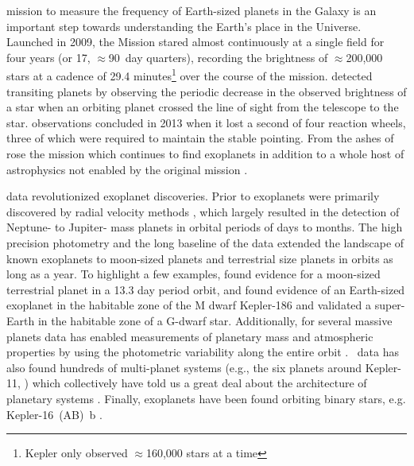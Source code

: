 
 mission to measure the frequency of Earth-sized planets in the Galaxy is an important step towards understanding the Earth's place in the Universe.  Launched in 2009, the \Kepler{} Mission \citep{Koch2010,Borucki2016} stared almost continuously at a single field for four years (or 17, $\approx$90~day quarters), recording the brightness of $\approx$200,000 stars at a cadence of 29.4 minutes\footnote{Kepler only observed $\approx$160,000 stars at a time} over the course of the mission. \Kepler{} detected transiting planets by observing the periodic decrease in the observed brightness of a star when an orbiting planet crossed the line of sight from the telescope to the star.  observations concluded in 2013 when it lost a second of four reaction wheels, three of which were required to maintain the stable pointing.  From the ashes of \Kepler{} rose the \Ktwo{} mission which continues to find exoplanets in addition to a whole host of astrophysics not enabled by the original \Kepler{} mission \citep{Howell2014,VanCleve2016K2}.


\Kepler{} data revolutionized exoplanet discoveries. Prior to \Kepler{,} exoplanets were primarily discovered by radial velocity methods \citep[e.g.][]{Mayor1995}, which largely resulted in the detection of Neptune- to Jupiter- mass planets in orbital periods of days to months. The high precision photometry and the long baseline of the \Kepler{} data extended the landscape of known exoplanets to moon-sized planets and terrestrial size planets in orbits as long as a year. To highlight a few examples, \citet{Barclay2013} found evidence for a moon-sized terrestrial planet in a 13.3 day period orbit, and \citet{Quintana2014} found evidence of an Earth-sized exoplanet in the habitable zone of the M dwarf Kepler-186 and \citet{Jenkins2015} validated a super-Earth in the habitable zone of a G-dwarf star. Additionally, for several massive planets \Kepler{} data has enabled measurements of planetary mass and atmospheric properties by using the photometric variability along the entire orbit \citep{Shporer2011,Mazeh2012,Shporer2017}. \Kepler\ data has also found hundreds of multi-planet systems (e.g., the six planets around Kepler-11, \citet{Lissauer2011}) which collectively have told us a great deal about the architecture of planetary systems \citep{Lissauer2011b,Fabrycky2014}.  Finally, exoplanets have been found orbiting binary stars, e.g. Kepler-16~(AB)~b \citep{Doyle2011}.

